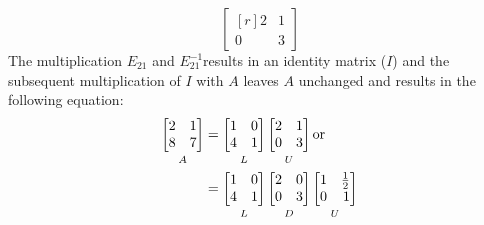 \documentclass[../main.tex]{subfiles}
\begin{document}
{\[\begin{bmatrix*}[r]
        2 & 1 \\
        0 & 3
    \end{bmatrix*}
\]
The multiplication $E_{21}$ and $E_{21}^{-1}$results in an identity matrix ($I$) and the subsequent multiplication of $I$ with $A$ leaves $A$ unchanged and results in the following equation:
\[
    \begin{aligned}
        \underbracket[0pt][0pt]{
            \begin{bmatrix*}[r]
                2 & 1 \\
                8 & 7
            \end{bmatrix*}
        }_{\mathstrut A}
         & =
        \underbracket[0pt][0pt]{
            \begin{bmatrix*}[r]
                1 & 0 \\
                4 & 1
            \end{bmatrix*}
        }_{\mathstrut L}
        \underbracket[0pt][0pt]{
            \begin{bmatrix*}[r]
                2 & 1 \\
                0 & 3
            \end{bmatrix*}
        }_{\mathstrut U}
        \text{or} \\
         &
        =
        \underbracket[0pt][0pt]{
            \begin{bmatrix*}[r]
                1 & 0 \\
                4 & 1
            \end{bmatrix*}
        }_{\mathstrut L}
        \underbracket[0pt][0pt]{
            \begin{bmatrix*}[r]
                2 & 0 \\
                0 & 3
            \end{bmatrix*}
        }_{\mathstrut D}
        \underbracket[0pt][0pt]{
            \begin{bmatrix*}[r]
                1 & \frac{1}{2} \\
                0 & 1
            \end{bmatrix*}
        }_{\mathstrut U}
    \end{aligned}
\]
}
\end{document}
